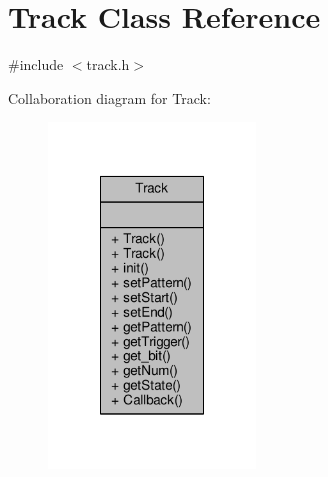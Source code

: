 \hypertarget{classTrack}{\section{Track Class Reference}
\label{classTrack}
}


{\ttfamily \#include $<$track.\-h$>$}



Collaboration diagram for Track\-:\nopagebreak
\begin{figure}[H]
\begin{center}
\leavevmode
\includegraphics[width=156pt]{classTrack__coll__graph}
\end{center}
\end{figure}
